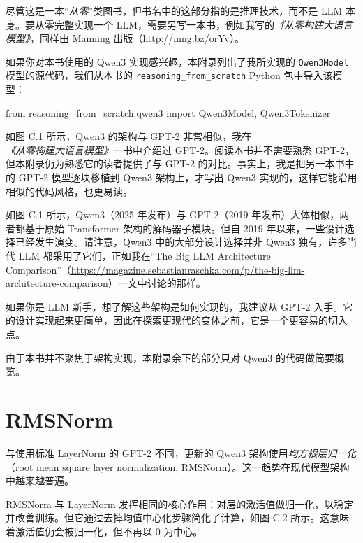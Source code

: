 尽管这是一本“\emph{从零}”类图书，但书名中的这部分指的是推理技术，而不是 LLM 本身。要从零完整实现一个 LLM，需要另写一本书，例如我写的\emph{《从零构建大语言模型》}，同样由 Manning 出版（\href{http://mng.bz/orYv}{http://mng.bz/orYv}）。

如果你对本书使用的 Qwen3 实现感兴趣，本附录列出了我所实现的 \texttt{Qwen3Model} 模型的源代码，我们从本书的 \texttt{reasoning\_from\_scratch} Python 包中导入该模型：

\begin{codebox}
from reasoning_from_scratch.qwen3 import Qwen3Model, Qwen3Tokenizer
\end{codebox}

如图 C.1 所示，Qwen3 的架构与 GPT-2 非常相似，我在\emph{《从零构建大语言模型》}一书中介绍过 GPT-2。阅读本书并不需要熟悉 GPT-2，但本附录仍为熟悉它的读者提供了与 GPT-2 的对比。事实上，我是把另一本书中的 GPT-2 模型逐块移植到 Qwen3 架构上，才写出 Qwen3 实现的，这样它能沿用相似的代码风格，也更易读。


如图 C.1 所示，Qwen3（2025 年发布）与 GPT-2（2019 年发布）大体相似，两者都基于原始 Transformer 架构的解码器子模块。但自 2019 年以来，一些设计选择已经发生演变。请注意，Qwen3 中的大部分设计选择并非 Qwen3 独有，许多当代 LLM 都采用了它们，正如我在“The Big LLM Architecture Comparison”（\href{https://magazine.sebastianraschka.com/p/the-big-llm-architecture-comparison}{https://magazine.sebastianraschka.com/p/the-big-llm-architecture-comparison}）一文中讨论的那样。

如果你是 LLM 新手，想了解这些架构是如何实现的，我建议从 GPT-2 入手。它的设计实现起来更简单，因此在探索更现代的变体之前，它是一个更容易的切入点。

由于本书并不聚焦于架构实现，本附录余下的部分只对 Qwen3 的代码做简要概览。

\section{RMSNorm}

与使用标准 LayerNorm 的 GPT-2 不同，更新的 Qwen3 架构使用\emph{均方根层归一化}（root mean square layer normalization, RMSNorm）。这一趋势在现代模型架构中越来越普遍。

RMSNorm 与 LayerNorm 发挥相同的核心作用：对层的激活值做归一化，以稳定并改善训练。但它通过去掉均值中心化步骤简化了计算，如图 C.2 所示。这意味着激活值仍会被归一化，但不再以 0 为中心。

